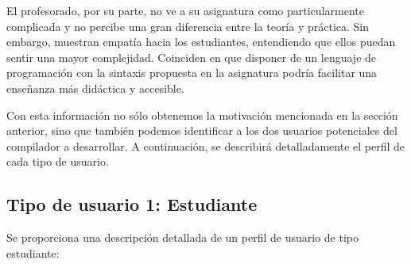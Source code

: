 El profesorado, por su parte, no ve a su asignatura como particularmente complicada y no percibe una gran diferencia entre la teoría y práctica. Sin embargo, muestran empatía hacia los estudiantes, entendiendo que ellos puedan sentir una mayor complejidad. Coinciden en que disponer de un lenguaje de programación con la sintaxis propuesta en la asignatura podría facilitar una enseñanza más didáctica y accesible.

Con esta información no sólo obtenemos la motivación mencionada en la sección anterior, sino que también podemos identificar a los dos usuarios potenciales del compilador a desarrollar. A continuación, se describirá detalladamente el perfil de cada tipo de usuario.

\subsection{Tipo de usuario 1: Estudiante}
Se proporciona una descripción detallada de un perfil de usuario de tipo estudiante:

